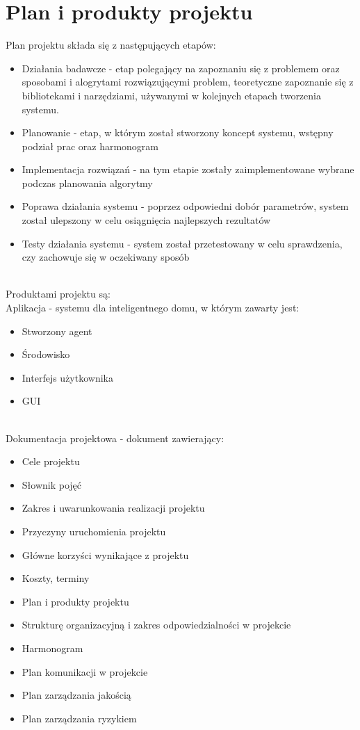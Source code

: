 \documentclass{article}
\begin{document}
\section{Plan i produkty projektu}
Plan projektu składa się z następujących etapów:
\begin{itemize}
\item Działania badawcze - etap polegający na zapoznaniu się z problemem oraz sposobami i alogrytami rozwiązującymi problem, teoretyczne zapoznanie się z bibliotekami i narzędziami, używanymi w kolejnych etapach tworzenia systemu.
\item Planowanie - etap, w którym został stworzony koncept systemu, wstępny podział prac oraz harmonogram
\item Implementacja rozwiązań - na tym etapie zostały zaimplementowane wybrane podczas planowania algorytmy
\item Poprawa działania systemu - poprzez odpowiedni dobór parametrów, system został ulepszony w celu osiągnięcia najlepszych rezultatów
\item Testy działania systemu - system został przetestowany w celu sprawdzenia, czy zachowuje się w oczekiwany sposób
\end{itemize} \mbox{}\\
Produktami projektu są: \mbox{}\\
Aplikacja - systemu dla inteligentnego domu, w którym zawarty jest:
\begin{itemize}
\item Stworzony agent
\item Środowisko
\item Interfejs użytkownika
\item GUI
\end{itemize} \mbox{}\\
Dokumentacja projektowa - dokument zawierający:
\begin{itemize}
\item Cele projektu
\item Słownik pojęć
\item Zakres i uwarunkowania realizacji projektu
\item Przyczyny uruchomienia projektu
\item Główne korzyści wynikające z projektu
\item Koszty, terminy
\item Plan i produkty projektu
\item Strukturę organizacyjną i zakres odpowiedzialności w projekcie
\item Harmonogram
\item Plan komunikacji w projekcie
\item Plan zarządzania jakością
\item Plan zarządzania ryzykiem
\end{itemize} \mbox{}\\
\end{document}
